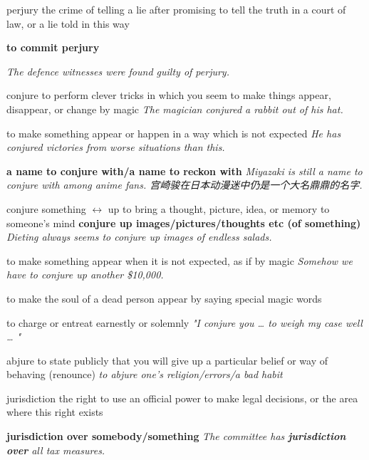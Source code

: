 \begin{DefWord}{perjury}
    the crime of telling a lie after promising to tell the truth in a court of law, or a lie told in this way

    \textbf{to commit perjury}

    \textit{The defence witnesses were found guilty of perjury.}
\end{DefWord}


\begin{DefWord}{conjure}
    to perform clever tricks in which you seem to make things appear, disappear, or change by magic
    \textit{The magician conjured a rabbit out of his hat.}

    to make something appear or happen in a way which is not expected
    \textit{He has conjured victories from worse situations than this.}

    \textbf{a name to conjure with/a name to reckon with}
    \textit{Miyazaki is still a name to conjure with among anime fans. 宫崎骏在日本动漫迷中仍是一个大名鼎鼎的名字.}

    conjure something $\leftrightarrow$ up
    to bring a thought, picture, idea, or memory to someone’s mind
    \textbf{conjure up images/pictures/thoughts etc (of something)}
    \textit{Dieting always seems to conjure up images of endless salads.}

    to make something appear when it is not expected, as if by magic
    \textit{Somehow we have to conjure up another \$10,000.}

    to make the soul of a dead person appear by saying special magic words

    to charge or entreat earnestly or solemnly
    \textit{"I conjure you … to weigh my case well … "}
\end{DefWord}

\begin{DefWord}{abjure}
    to state publicly that you will give up a particular belief or way of behaving (renounce)
    \textit{to abjure one's religion/errors/a bad habit}
\end{DefWord}


\begin{DefWord}{jurisdiction}
    the right to use an official power to make legal decisions, or the area where this right exists

    \textbf{jurisdiction over somebody/something}
    \textit{The committee has \textbf{jurisdiction over} all tax measures.}

\end{DefWord}




